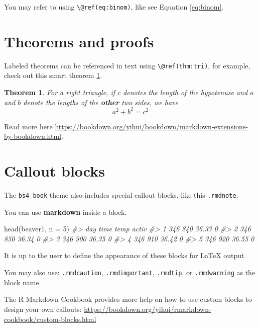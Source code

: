 \documentclass[
  12pt,
]{book}
\newenvironment{Shaded}{\begin{snugshade}}{\end{snugshade}}
\newcommand{\AttributeTok}[1]{\textcolor[rgb]{0.77,0.63,0.00}{#1}}
\newcommand{\CommentTok}[1]{\textcolor[rgb]{0.56,0.35,0.01}{\textit{#1}}}
\newcommand{\DecValTok}[1]{\textcolor[rgb]{0.00,0.00,0.81}{#1}}
\newcommand{\FunctionTok}[1]{\textcolor[rgb]{0.00,0.00,0.00}{#1}}
\newcommand{\NormalTok}[1]{#1}
\newtheorem{theorem}{Theorem}[chapter]
\theoremstyle{definition}
\theoremstyle{definition}
\theoremstyle{definition}
\theoremstyle{definition}
\theoremstyle{remark}
\begin{document}
You may refer to using \texttt{\textbackslash{}@ref(eq:binom)}, like see Equation \eqref{eq:binom}.

\hypertarget{theorems-and-proofs}{%
\section{Theorems and proofs}\label{theorems-and-proofs}}

Labeled theorems can be referenced in text using \texttt{\textbackslash{}@ref(thm:tri)}, for example, check out this smart theorem \ref{thm:tri}.

\begin{theorem}
\protect\hypertarget{thm:tri}{}\label{thm:tri}For a right triangle, if \(c\) denotes the \emph{length} of the hypotenuse
and \(a\) and \(b\) denote the lengths of the \textbf{other} two sides, we have
\[a^2 + b^2 = c^2\]
\end{theorem}

Read more here \url{https://bookdown.org/yihui/bookdown/markdown-extensions-by-bookdown.html}.

\hypertarget{callout-blocks}{%
\section{Callout blocks}\label{callout-blocks}}

The \texttt{bs4\_book} theme also includes special callout blocks, like this \texttt{.rmdnote}.

You can use \textbf{markdown} inside a block.

\begin{Shaded}
\begin{Highlighting}[]
\FunctionTok{head}\NormalTok{(beaver1, }\AttributeTok{n =} \DecValTok{5}\NormalTok{)}
\CommentTok{\#\textgreater{}   day time  temp activ}
\CommentTok{\#\textgreater{} 1 346  840 36.33     0}
\CommentTok{\#\textgreater{} 2 346  850 36.34     0}
\CommentTok{\#\textgreater{} 3 346  900 36.35     0}
\CommentTok{\#\textgreater{} 4 346  910 36.42     0}
\CommentTok{\#\textgreater{} 5 346  920 36.55     0}
\end{Highlighting}
\end{Shaded}

It is up to the user to define the appearance of these blocks for LaTeX output.

You may also use: \texttt{.rmdcaution}, \texttt{.rmdimportant}, \texttt{.rmdtip}, or \texttt{.rmdwarning} as the block name.

The R Markdown Cookbook provides more help on how to use custom blocks to design your own callouts: \url{https://bookdown.org/yihui/rmarkdown-cookbook/custom-blocks.html}
\end{document}
